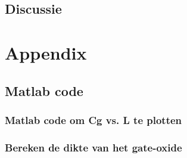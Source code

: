 \documentclass{report}
\begin{document}
\section{Discussie}



\chapter{Appendix}
\section{Matlab code}
\subsection{Matlab code om Cg vs. L te plotten}
\label{M1}

\subsection{Bereken de dikte van het gate-oxide}
\label{M2}
\end{document}
